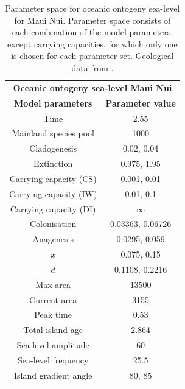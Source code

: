 \begin{table}[ht]
    \centering
    \caption{Parameter space for oceanic ontogeny sea-level for Maui Nui. Parameter space consists of each combination of the model parameters, except carrying capacities, for which only one is chosen for each parameter set. Geological data from \cite{lim_true_2017}.}
    \begin{tabular}{ c | c }
        \multicolumn{2}{c}{\textbf{Oceanic ontogeny sea-level Maui Nui}} \\
        \textbf{Model parameters} & \textbf{Parameter value} \\ 
        \hline
        \hline
        Time & 2.55 \\
        \hline
        Mainland species pool & 1000 \\
        \hline
        Cladogenesis & 0.02, 0.04 \\
        \hline
        Extinction & 0.975, 1.95 \\
        \hline
        Carrying capacity (CS) & 0.001, 0.01 \\
        \hline
        Carrying capacity (IW) & 0.01, 0.1 \\
        \hline
        Carrying capacity (DI) & $\infty$ \\
        \hline
        Colonisation & 0.03363, 0.06726 \\
        \hline
        Anagenesis & 0.0295, 0.059 \\
        \hline
        $x$ & 0.075, 0.15 \\
        \hline
        $d$ & 0.1108, 0.2216 \\
        \hline
        Max area & 13500 \\
        \hline
        Current area & 3155 \\
        \hline
        Peak time & 0.53 \\
        \hline
        Total island age & 2.864 \\
        \hline
        Sea-level amplitude & 60 \\
        \hline
        Sea-level frequency & 25.5 \\
        \hline
        Island gradient angle & 80, 85 \\
    \end{tabular}
    \label{tab:oceanic_ontogeny_sea_level_young}
\end{table}

